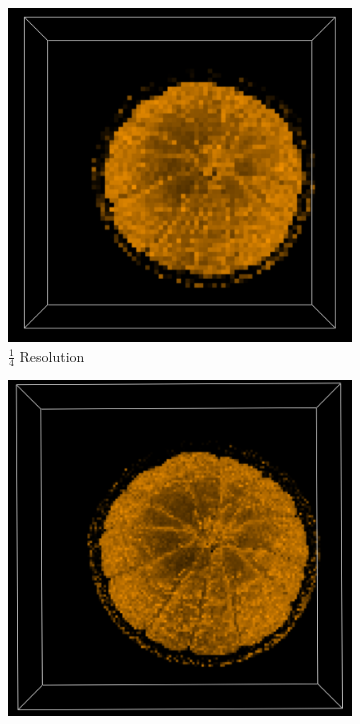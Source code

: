 \documentclass[a4paper,twoside,11pt]{article}
\begin{document}
\begin{figure}[h]
\begin{center}
        \begin{subfigure}[b]{0.23\textwidth}
                \includegraphics[width=\textwidth]{Images/res4.png}
                \caption{$\frac{1}{4}$ Resolution}
                \label{fig:res4}
        \end{subfigure}
        \begin{subfigure}[b]{0.23\textwidth}
                \includegraphics[width=\textwidth]{Images/res2.png}

\end{subfigure}
\end{center}
\end{figure}
\end{document}
